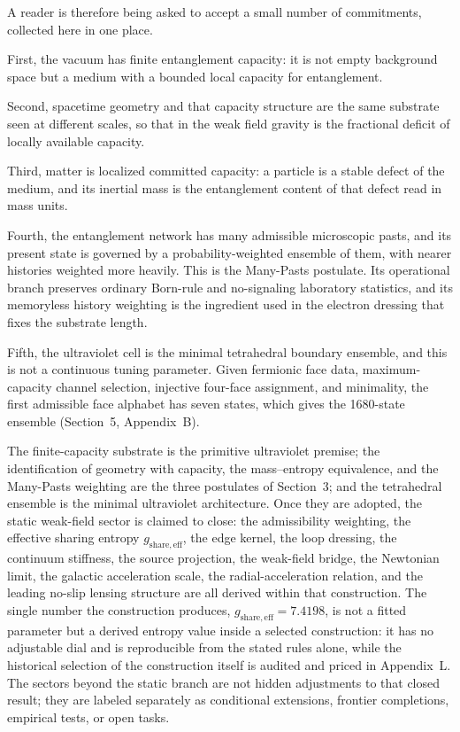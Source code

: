 \documentclass[11pt]{article}
\begin{document}
A reader is therefore being asked to accept a small number of commitments, collected here in one place.

First, the vacuum has finite entanglement capacity: it is not empty background space but a medium with a bounded local capacity for entanglement.

Second, spacetime geometry and that capacity structure are the same substrate seen at different scales, so that in the weak field gravity is the fractional deficit of locally available capacity.

Third, matter is localized committed capacity: a particle is a stable defect of the medium, and its inertial mass is the entanglement content of that defect read in mass units.

Fourth, the entanglement network has many admissible microscopic pasts, and its present state is governed by a probability-weighted ensemble of them, with nearer histories weighted more heavily. This is the Many-Pasts postulate. Its operational branch preserves ordinary Born-rule and no-signaling laboratory statistics, and its memoryless history weighting is the ingredient used in the electron dressing that fixes the substrate length.

Fifth, the ultraviolet cell is the minimal tetrahedral boundary ensemble, and this is not a continuous tuning parameter. Given fermionic face data, maximum-capacity channel selection, injective four-face assignment, and minimality, the first admissible face alphabet has seven states, which gives the 1680-state ensemble (Section~5, Appendix~B).

The finite-capacity substrate is the primitive ultraviolet premise; the identification of geometry with capacity, the mass--entropy equivalence, and the Many-Pasts weighting are the three postulates of Section~3; and the tetrahedral ensemble is the minimal ultraviolet architecture. Once they are adopted, the static weak-field sector is claimed to close: the admissibility weighting, the effective sharing entropy $g_{\mathrm{share,eff}}$, the edge kernel, the loop dressing, the continuum stiffness, the source projection, the weak-field bridge, the Newtonian limit, the galactic acceleration scale, the radial-acceleration relation, and the leading no-slip lensing structure are all derived within that construction. The single number the construction produces, $g_{\mathrm{share,eff}}=7.4198$, is not a fitted parameter but a derived entropy value inside a selected construction: it has no adjustable dial and is reproducible from the stated rules alone, while the historical selection of the construction itself is audited and priced in Appendix~L. The sectors beyond the static branch are not hidden adjustments to that closed result; they are labeled separately as conditional extensions, frontier completions, empirical tests, or open tasks.
\end{document}
